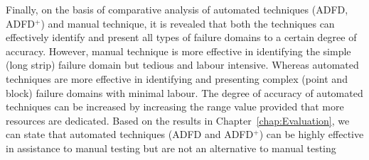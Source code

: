 Finally, on the basis of comparative analysis of automated techniques (ADFD, ADFD$^+$) and manual technique, it is revealed that both the techniques can effectively identify and present all types of failure domains to a certain degree of accuracy. However, manual technique is more effective in identifying the simple (long strip) failure domain but tedious and labour intensive. Whereas automated techniques are more effective in identifying and presenting complex (point and block) failure domains with minimal labour. The degree of accuracy of automated techniques can be increased by increasing the range value provided that more resources are dedicated. Based on the results in Chapter~\ref{chap:Evaluation}, we can state that automated techniques (ADFD and ADFD$^+$) can be highly effective in assistance to manual testing but are not an alternative to manual testing








